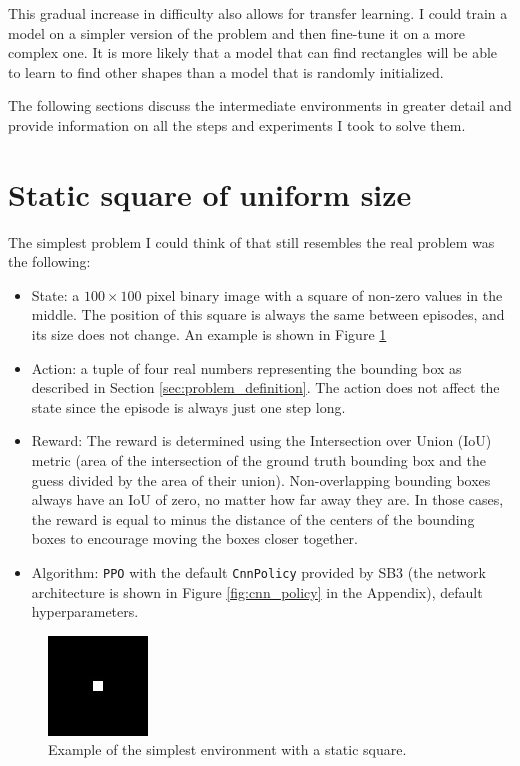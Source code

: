 \documentclass[
  digital,     %
  oneside,     %
  nosansbold,  %
  nocolorbold, %
  lof,         %
  lot,         %
]{fithesis4}
\begin{document}
This gradual increase in difficulty also allows for transfer learning. I could train a model on a simpler version of the problem and then fine-tune it on a more complex one. It is more likely that a model that can find rectangles will be able to learn to find other shapes than a model that is randomly initialized.

The following sections discuss the intermediate environments in greater detail and provide information on all the steps and experiments I took to solve them.

\section{Static square of uniform size}
The simplest problem I could think of that still resembles the real problem was the following:
\begin{itemize}
    \item State: a $100\times100$ pixel binary image with a square of non-zero values in the middle. The position of this square is always the same between episodes, and its size does not change. An example is shown in Figure \ref{fig:env0}
    \item Action: a tuple of four real numbers representing the bounding box as described in Section \ref{sec:problem_definition}. The action does not affect the state since the episode is always just one step long.
    \item Reward: The reward is determined using the Intersection over Union (IoU) metric (area of the intersection of the ground truth bounding box and the guess divided by the area of their union). Non-overlapping bounding boxes always have an IoU of zero, no matter how far away they are. In those cases, the reward is equal to minus the distance of the centers of the bounding boxes to encourage moving the boxes closer together.
    \item Algorithm: \texttt{PPO} with the default \texttt{CnnPolicy} provided by SB3 (the network architecture is shown in Figure \ref{fig:cnn_policy} in the Appendix), default hyperparameters.
\end{itemize}

\begin{figure}
    \includegraphics[width=0.5\linewidth]{env_examples/env0.jpg}
    \caption{Example of the simplest environment with a static square.}
    \label{fig:env0}
\end{figure}
\end{document}
